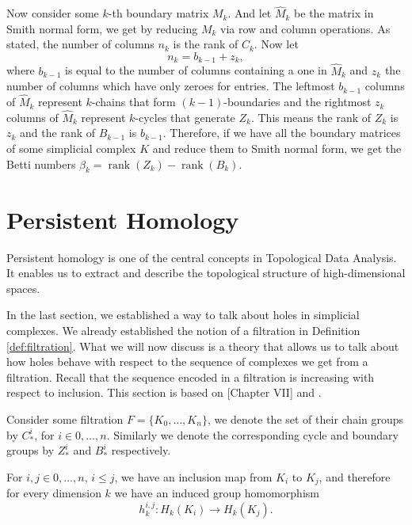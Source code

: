 Now consider some $k$-th boundary matrix $M_k$. And let $\hat{M}_k$ be the matrix in Smith normal form, we get by reducing $M_k$ via row and column operations. As stated, the number of columns $n_k$ is the rank of $C_k$. Now let \[n_k = b_{k-1} + z_k,\]
where $b_{k-1}$ is equal to the number of columns containing a one in $\hat{M}_k$ and $z_k$ the number of columns which have only zeroes for entries. The leftmost $b_{k-1}$ columns of $\hat{M}_k$ represent $k$-chains that form $(k-1)$-boundaries and the rightmost $z_k$ columns of $\hat{M}_k$ represent $k$-cycles that generate $Z_k$. This means the rank of $Z_k$ is $z_k$ and the rank of $B_{k-1}$ is $b_{k-1}$. Therefore, if we have all the boundary matrices of some simplicial complex $K$ and reduce them to Smith normal form, we get the Betti numbers $\beta_k = \operatorname{rank}(Z_k) - \operatorname{rank}(B_k)$. 

\section{Persistent Homology}

Persistent homology is one of the central concepts in Topological Data Analysis. It enables us to extract and describe the topological structure of high-dimensional spaces. 

In the last section, we established a way to talk about holes in simplicial complexes. We already established the notion of a filtration in Definition \ref{def:filtration}. What we will now discuss is a theory that allows us to talk about how holes behave with respect to the sequence of complexes we get from a filtration. 
Recall that the sequence encoded in a filtration is increasing with respect to inclusion. This section is based on \cite{persistence_and_simplification}[Chapter VII] and \cite{pershom}.

Consider some filtration $F = \{K_0,\dots,K_n\}$, we denote the set of their chain groups by $C_*^i$, for $i \in 0,\dots,n$. Similarly we denote the corresponding cycle and boundary groups by $Z_*^i$ and $B_*^i$ respectively. 

For $i,j \in 0, \dots, n$, $i \leq j$, we have an inclusion map from $K_i$ to $K_j$, and therefore for every dimension $k$ we have an induced group homomorphism 
\[h_k^{i,j}: H_k(K_i) \rightarrow H_k(K_j).\]

